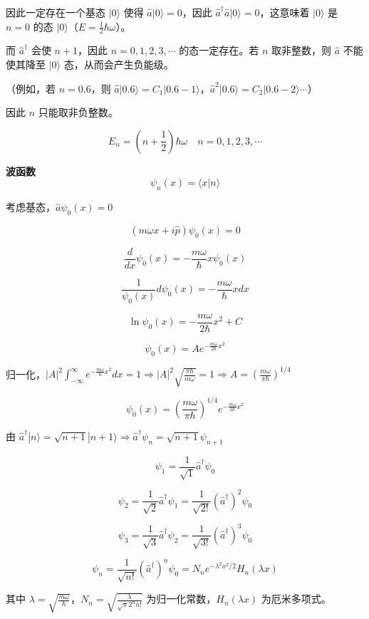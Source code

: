 \documentclass[lang=cn,10pt]{elegantbook}
\begin{document}
因此一定存在一个基态 \(|0\rangle\) 使得 \(\hat{a} |0\rangle = 0\)，因此 \(\hat{a}^\dagger \hat{a} |0\rangle = 0\)，这意味着 \(|0\rangle\) 是 \(n=0\) 的态 \(|0\rangle\)（\(E = \frac{1}{2}\hbar \omega\)）。

而 \(\hat{a}^\dagger\) 会使 \(n+1\)，因此 \(n=0, 1, 2, 3, \cdots\) 的态一定存在。若 \(n\) 取非整数，则 \(\hat{a}\) 不能使其降至 \(|0\rangle\) 态，从而会产生负能级。

	（例如，若 \(n=0.6\)，则 \(\hat{a} |0.6\rangle = C_1 |0.6-1\rangle\)，\(\hat{a}^2 |0.6\rangle = C_2 |0.6-2\rangle \cdots\)）

因此 \(n\) 只能取非负整数。

\[
E_n = \left( n + \frac{1}{2} \right) \hbar \omega \quad n = 0, 1, 2, 3, \cdots
\]

\textbf{波函数}
\[
\psi_n(x) = \langle x | n \rangle
\]

考虑基态，\(\hat{a} \psi_0(x) = 0\)

\[
(m \omega x + i \hat{p}) \psi_0(x) = 0
\]

\[
\frac{d}{dx} \psi_0(x) = -\frac{m \omega}{\hbar} x \psi_0(x)
\]

\[
\frac{1}{\psi_0(x)} d\psi_0(x) = -\frac{m \omega}{\hbar} x dx
\]

\[
\ln \psi_0(x) = -\frac{m \omega}{2\hbar} x^2 + C
\]

\[
\psi_0(x) = A e^{-\frac{m \omega}{2\hbar} x^2}
\]

归一化，\(|A|^2 \int_{-\infty}^{\infty} e^{-\frac{m \omega}{\hbar} x^2} dx = 1 \Rightarrow |A|^2 \sqrt{\frac{\pi \hbar}{m \omega}} = 1 \Rightarrow A = \left( \frac{m \omega}{\pi \hbar} \right)^{1/4}\)

\[
\psi_0(x) = \left( \frac{m \omega}{\pi \hbar} \right)^{1/4} e^{-\frac{m \omega}{2\hbar} x^2}
\]

由 \(\hat{a}^\dagger |n\rangle = \sqrt{n+1} |n+1\rangle \Rightarrow \hat{a}^\dagger \psi_n = \sqrt{n+1} \psi_{n+1}\)

\[
\psi_1 = \frac{1}{\sqrt{1}} \hat{a}^\dagger \psi_0
\]

\[
\psi_2 = \frac{1}{\sqrt{2}} \hat{a}^\dagger \psi_1 = \frac{1}{\sqrt{2!}} (\hat{a}^\dagger)^2 \psi_0
\]

\[
\psi_3 = \frac{1}{\sqrt{3}} \hat{a}^\dagger \psi_2 = \frac{1}{\sqrt{3!}} (\hat{a}^\dagger)^3 \psi_0
\]

\[
\psi_n = \frac{1}{\sqrt{n!}} (\hat{a}^\dagger)^n \psi_0 = N_n e^{-\lambda^2 x^2/2} H_n(\lambda x)
\]

其中 \(\lambda = \sqrt{\frac{m \omega}{\hbar}}\)，\(N_n = \sqrt{\frac{\lambda}{\sqrt{\pi} 2^n n!}}\) 为归一化常数，\(H_n(\lambda x)\) 为厄米多项式。
\end{document}
